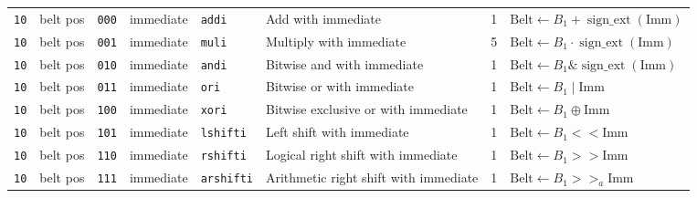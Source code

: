 \documentclass{article}
\begin{document}
\begin{landscape}
\begin{longtable}{c c c c l l r l}
		\texttt{10} & belt pos & \texttt{000} & immediate & \texttt{addi}     & Add with immediate                    & 1 & \(
			\textrm{Belt} \gets B_1 + \operatorname{sign\_ext}\left(\textrm{Imm}\right)\) \\
		\texttt{10} & belt pos & \texttt{001} & immediate & \texttt{muli}     & Multiply with immediate               & 5 & \(
			\textrm{Belt} \gets B_1 \cdot \operatorname{sign\_ext}\left(\textrm{Imm}\right)\) \\
		\texttt{10} & belt pos & \texttt{010} & immediate & \texttt{andi}     & Bitwise and with immediate            & 1 & \(
			\textrm{Belt} \gets B_1 \mathop{\&} \operatorname{sign\_ext}\left(\textrm{Imm}\right)\) \\
		\texttt{10} & belt pos & \texttt{011} & immediate & \texttt{ori}      & Bitwise or with immediate             & 1 & \(
			\textrm{Belt} \gets B_1 \mathop{|} \textrm{Imm}\) \\
		\texttt{10} & belt pos & \texttt{100} & immediate & \texttt{xori}     & Bitwise exclusive or with immediate   & 1 & \(
			\textrm{Belt} \gets B_1 \oplus \textrm{Imm}\) \\
		\texttt{10} & belt pos & \texttt{101} & immediate & \texttt{lshifti}  & Left shift with immediate             & 1 & \(
			\textrm{Belt} \gets B_1 << \textrm{Imm}\) \\
		\texttt{10} & belt pos & \texttt{110} & immediate & \texttt{rshifti}  & Logical right shift with immediate    & 1 & \(
			\textrm{Belt} \gets B_1 >> \textrm{Imm}\) \\
		\texttt{10} & belt pos & \texttt{111} & immediate & \texttt{arshifti} & Arithmetic right shift with immediate & 1 & \(
			\textrm{Belt} \gets B_1 >>_a \textrm{Imm}\) \\


\end{longtable}
\end{landscape}
\end{document}
